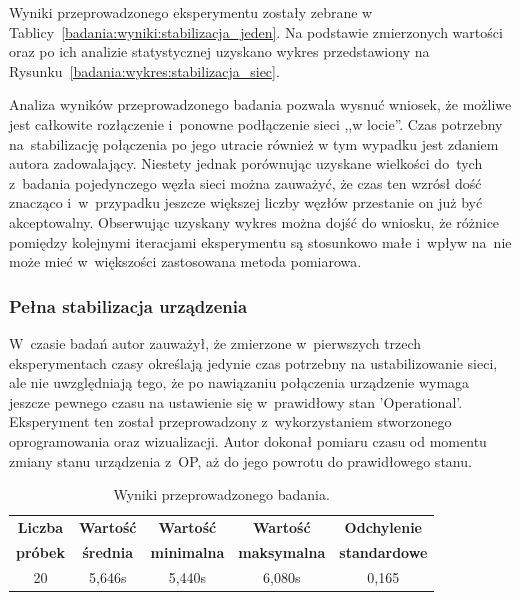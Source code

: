 \noindent Wyniki przeprowadzonego eksperymentu zostały zebrane w Tablicy~\ref{badania:wyniki:stabilizacja_jeden}. Na podstawie zmierzonych wartości oraz po ich analizie statystycznej uzyskano wykres przedstawiony na Rysunku~\ref{badania:wykres:stabilizacja_siec}.


Analiza wyników przeprowadzonego badania pozwala wysnuć wniosek, że możliwe jest całkowite rozłączenie i~ponowne podłączenie sieci ,,w locie''. Czas potrzebny na~stabilizację połączenia po jego utracie również w tym wypadku jest zdaniem autora zadowalający. Niestety jednak porównując uzyskane wielkości do~tych z~badania pojedynczego węzła sieci można zauważyć, że czas ten wzrósł dość znacząco i~w~przypadku jeszcze większej liczby węzłów przestanie on już być akceptowalny. Obserwując uzyskany wykres można dojść do wniosku, że różnice pomiędzy kolejnymi iteracjami eksperymentu są stosunkowo małe i~wpływ na~nie może mieć w~większości zastosowana metoda pomiarowa.

\subsubsection{Pełna stabilizacja urządzenia}
W~czasie badań autor zauważył, że zmierzone w~pierwszych trzech eksperymentach czasy określają jedynie czas potrzebny na ustabilizowanie sieci, ale nie uwzględniają tego, że po nawiązaniu połączenia urządzenie wymaga jeszcze pewnego czasu na ustawienie się w~prawidłowy stan 'Operational'. Eksperyment ten został przeprowadzony z~wykorzystaniem stworzonego oprogramowania oraz wizualizacji. Autor dokonał pomiaru czasu od momentu zmiany stanu urządzenia z~OP, aż do jego powrotu do prawidłowego stanu.

\begin{table}[!htb]
\begin{center}
\begin{tabular}{| c | c | c | c | c |}\hline
\textbf{Liczba} & \textbf{Wartość} & \textbf{Wartość} & \textbf{Wartość} & \textbf{Odchylenie} \\
\textbf{próbek} & \textbf{średnia} & \textbf{minimalna} & \textbf{maksymalna} & \textbf{standardowe} \\\hline\hline
20 & 5,646s & 5,440s & 6,080s & 0,165\\\hline
\end{tabular}
\end{center}
\vspace*{-6mm}
  \caption{Wyniki przeprowadzonego badania.}
	\label{badania:wyniki:op_jeden}
\end{table}

